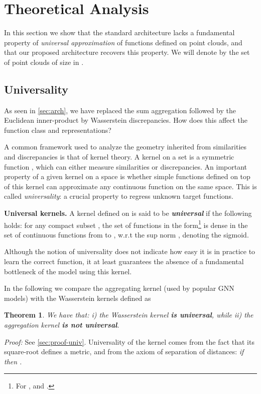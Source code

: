 \documentclass[letterpaper]{article} \usepackage{aaai22}  \usepackage{times}  \usepackage{helvet}  \usepackage{courier}  \usepackage[hyphens]{url}  \usepackage{graphicx} \urlstyle{rm} \def\UrlFont{\rm}  \usepackage{natbib}  \usepackage{caption} \DeclareCaptionStyle{ruled}{labelfont=normalfont,labelsep=colon,strut=off} \frenchspacing  \setlength{\pdfpagewidth}{8.5in}  \setlength{\pdfpageheight}{11in}  \usepackage{algorithm}
\newtheorem{theorem}{Theorem}
\begin{document}
\section{Theoretical Analysis} \label{sec:theory}

In this section we show that the standard architecture lacks a fundamental property of \textit{universal approximation} of functions defined on point clouds, and that our proposed architecture recovers this property. We will denote by  the set of point clouds  of size  in .

\subsection{Universality}\label{ssec:univ}

As seen in \cref{sec:arch}, we have replaced the sum aggregation  followed by the Euclidean inner-product  by Wasserstein discrepancies. How does this affect the function class and representations?

A common framework used to analyze the geometry inherited from similarities and discrepancies is that of kernel theory. A kernel  on a set  is a symmetric function , which can either measure similarities or discrepancies. An important property of a given kernel on a space  is whether simple functions defined on top of this kernel can approximate any continuous function on the same space. This is called \textit{universality}: a crucial property to regress unknown target functions.

\noindent\textbf{Universal kernels.} A kernel  defined on  is said to be \textbf{\textit{universal}} if the following holds: for any compact subset , the set of functions in the form\footnote{For ,  and .}  is dense in the set  of continuous functions from  to , w.r.t the sup norm ,  denoting the sigmoid.

Although the notion of universality does not indicate how easy it is in practice to learn the correct function, it at least guarantees the absence of a fundamental bottleneck of the model using this kernel.

In the following we compare the aggregating kernel  (used by popular GNN models) with the Wasserstein kernels defined as 
 




\begin{theorem} 
\label{thm:univ}
We have that: i) the Wasserstein kernel  \textbf{is universal}, while ii) the aggregation kernel  \textbf{is not universal}. 
\end{theorem}
\textit{Proof:} See \cref{sec:proof-univ}. Universality of the  kernel comes from the fact that its square-root defines a metric, and from the axiom of separation of distances: \textit{if  then .}
\end{document}
